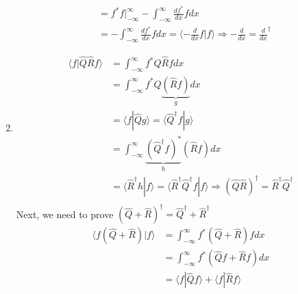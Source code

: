 \documentclass{article}
\begin{document}
\begin{enumerate}[label=(\alph*)]
\begin{align*}
		                                         & = f^* f \Big|_{-\infty}^{\infty} - \int_{-\infty}^{\infty} \frac{df^*}{dx} f dx                                                        \\
		                                         & = -\int_{-\infty}^{\infty} \frac{df^*}{dx} f dx = \langle -\frac{d}{dx} f | f \rangle \Rightarrow -\frac{d}{dx} = \frac{d}{dx}^\dagger
	      \end{align*}
	\item
	      \begin{align*}
		      \langle f | \hat{Q} \hat{R} f \rangle & = \int_{-\infty}^{\infty} f^* \hat{Q} \hat{R} f dx                                                                                                                      \\
		                                            & = \int_{-\infty}^{\infty} f^* \hat{Q} \underbrace{\left(\hat{R} f\right)}_{g} dx                                                                                        \\
		                                            & = \langle f | \hat{Q} g \rangle = \langle \hat{Q}^\dagger f | g \rangle                                                                                                 \\
		                                            & = \int_{-\infty}^{\infty} \underbrace{(\hat{Q}^\dagger f)^*}_{h} (\hat{R} f) dx                                                                                         \\
		                                            & = \langle \hat{R}^\dagger h | f \rangle = \langle \hat{R}^\dagger \hat{Q}^\dagger f | f \rangle \Rightarrow (\hat{Q} \hat{R})^\dagger = \hat{R}^\dagger \hat{Q}^\dagger \\
	      \end{align*}
	      Next, we need to prove \((\hat{Q} + \hat{R})^\dagger = \hat{Q}^\dagger + \hat{R}^\dagger\)
	      \begin{align*}
		      \langle f (\hat{Q} + \hat{R}) | f \rangle & = \int_{-\infty}^{\infty} f^* (\hat{Q} + \hat{R}) f dx                                                                                             \\
		                                                & = \int_{-\infty}^{\infty} f^* \left(\hat{Q}f + \hat{R}f\right) dx                                                                                  \\
		                                                & = \langle f | \hat{Q} f \rangle + \langle f | \hat{R} f \rangle                                                                                    \\

\end{align*}
\end{enumerate}
\end{document}
